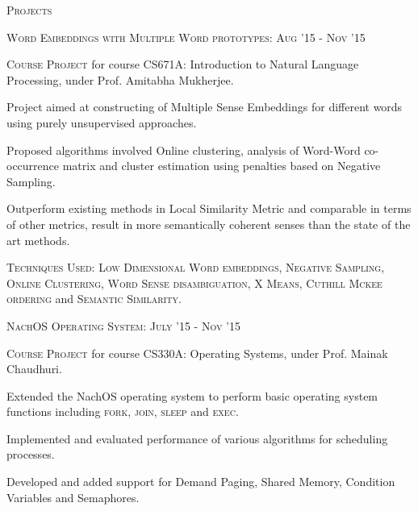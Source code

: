 \documentclass[10pt]{article}
\begin{document}
	\vspace{3mm}

	{\centering\Large{\textsc{Projects}} \hrulefill}
		
	\vspace{3mm}
	
	\large{\textsc{Word Embeddings with Multiple Word prototypes:}}   \hfill \small\textsc{Aug '15 - Nov '15}
	\begin{itemize}
	\small
	{
	\item \textsc{Course Project} for course CS671A: Introduction to Natural Language Processing, under Prof. Amitabha Mukherjee.
	\item Project aimed at constructing of Multiple Sense Embeddings for different words using purely unsupervised approaches.
	\item Proposed algorithms involved Online clustering, analysis of Word-Word co-occurrence matrix and cluster estimation using penalties based on Negative Sampling.
	\item Outperform existing methods in Local Similarity Metric and comparable in terms of other metrics, result in more semantically coherent senses than the state of the art methods.
	\item \textsc{Techniques Used:} \textsc{Low Dimensional Word embeddings, Negative Sampling, Online Clustering, Word Sense disambiguation, X Means, Cuthill Mckee ordering} and \textsc{Semantic Similarity}.
	}
	\end{itemize}
		
	\vspace{2mm}

	\large{\textsc{NachOS Operating System:}}   \hfill \small\textsc{July '15 - Nov '15}
	\begin{itemize}
	\small
	{
	\item \textsc{Course Project} for course CS330A: Operating Systems, under Prof. Mainak Chaudhuri.
	\item Extended the NachOS operating system to perform basic operating system functions including \textsc{fork, join, sleep} and \textsc{exec}. 
	\item Implemented and evaluated performance of various algorithms for scheduling processes.
	\item Developed and added support for Demand Paging, Shared Memory, Condition Variables and Semaphores.	
	}
	\end{itemize}
		
	\vspace{2mm}
\end{document}
